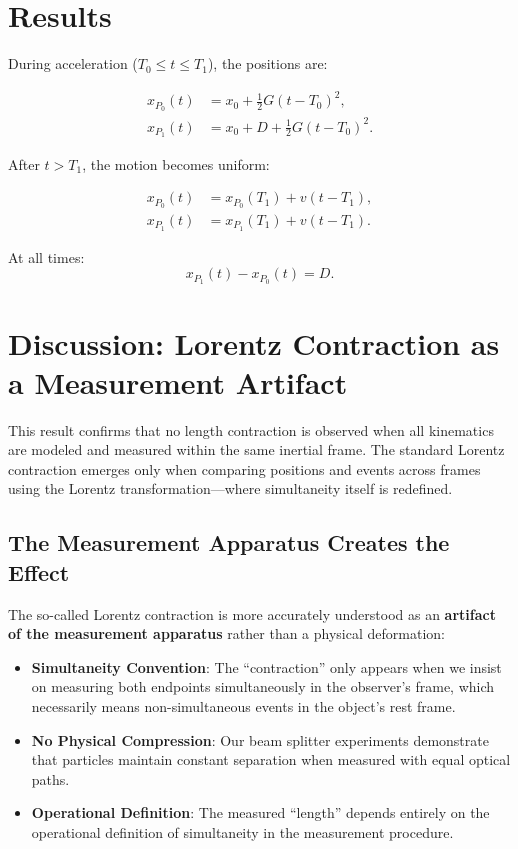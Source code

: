 \documentclass[11pt]{article}
\begin{document}
\section{Results}

During acceleration ($T_0 \le t \le T_1$), the positions are:

\begin{align*}
    x_{P_0}(t) &= x_0 + \frac{1}{2}G(t - T_0)^2, \\
    x_{P_1}(t) &= x_0 + D + \frac{1}{2}G(t - T_0)^2.
\end{align*}

After $t > T_1$, the motion becomes uniform:

\begin{align*}
    x_{P_0}(t) &= x_{P_0}(T_1) + v(t - T_1), \\
    x_{P_1}(t) &= x_{P_1}(T_1) + v(t - T_1).
\end{align*}

At all times:
\[
x_{P_1}(t) - x_{P_0}(t) = D.
\]

\section{Discussion: Lorentz Contraction as a Measurement Artifact}

This result confirms that no length contraction is observed when all kinematics are modeled and measured within the same inertial frame. The standard Lorentz contraction emerges only when comparing positions and events across frames using the Lorentz transformation—where simultaneity itself is redefined.

\subsection{The Measurement Apparatus Creates the Effect}

The so-called Lorentz contraction is more accurately understood as an \textbf{artifact of the measurement apparatus} rather than a physical deformation:

\begin{itemize}
    \item \textbf{Simultaneity Convention}: The ``contraction'' only appears when we insist on measuring both endpoints simultaneously in the observer's frame, which necessarily means non-simultaneous events in the object's rest frame.
    \item \textbf{No Physical Compression}: Our beam splitter experiments demonstrate that particles maintain constant separation when measured with equal optical paths.
    \item \textbf{Operational Definition}: The measured ``length'' depends entirely on the operational definition of simultaneity in the measurement procedure.
\end{itemize}
\end{document}
